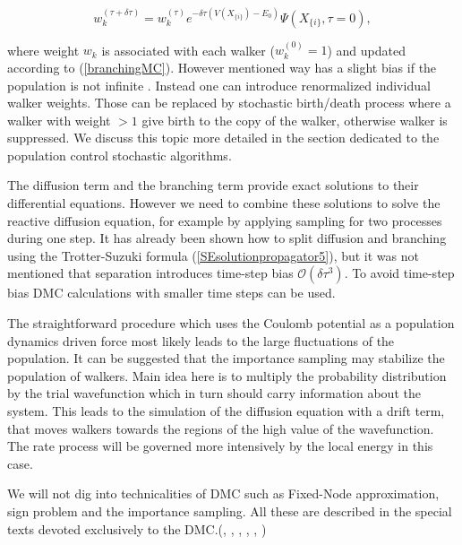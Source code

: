\documentclass[twoside,english]{uiofysmaster}
\begin{document}
\begin{equation}\label{branchingMC}
w_k^{(\tau + \delta \tau)} = w_k^{(\tau)} e^{-\delta \tau(V(X_{\{i\}}) - E_0)}\Psi(X_{\{i\}}, \tau=0),
\end{equation}

where weight $w_k$ is associated with each walker ($w_k^{(0)}=1$) and updated according to (\ref{branchingMC}). However mentioned way has a slight bias if the population is not infinite \cite{Aspuru-GuzikQuantumMonteCarlo}. Instead one can introduce renormalized individual walker weights. Those can be replaced by stochastic birth/death process where a walker with weight $> 1$ give birth to the copy of the walker, otherwise walker is suppressed. We discuss this topic more detailed in the section dedicated to the population control stochastic algorithms.

The diffusion term and the branching term provide exact solutions to their differential equations. However we need to combine these solutions to solve the reactive diffusion equation, for example by applying sampling for two processes during one step. It has already been shown how to split diffusion and branching using the Trotter-Suzuki formula (\ref{SEsolutionpropagator5}), but it was not mentioned that separation introduces time-step bias $\mathcal{O}(\delta \tau^3)$.
To avoid time-step bias DMC calculations with smaller time steps can be used.


The straightforward procedure which uses the Coulomb potential as a population dynamics driven force  most likely leads to the large fluctuations of the population.
It can be suggested that the importance sampling may stabilize the population of walkers. Main idea here is to multiply the probability distribution by the trial wavefunction which in turn should carry information about the system. This leads to the simulation of the diffusion equation with a drift term, that moves walkers towards the regions of the high value of the wavefunction. The rate process will be governed more intensively by the local energy in this case.

We will not dig into technicalities of DMC such as Fixed-Node approximation, sign problem and the importance sampling. All these are described in the special texts devoted exclusively to the DMC.(\cite{KolorencApplicationsquantumMonte2011}, \cite{AustinQuantumMonteCarlo2012}, \cite{Hjorth-Jensenadvancedcoursecomputational2017}, \cite{ToulouseIntroductionVariationalDiffusion2016}, \cite{Aspuru-GuzikQuantumMonteCarlo}, \cite{KosztinIntroductiondiffusionMonte1996})
\end{document}
